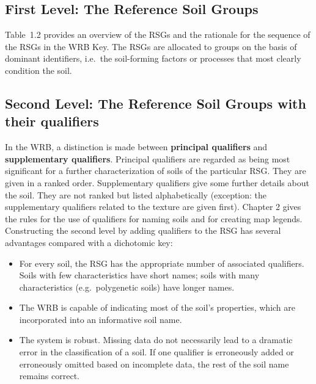 \documentclass[
  letterpaper,
  DIV=11,
  numbers=noendperiod]{scrreprt}
\providecommand{\tightlist}{%
  \setlength{\itemsep}{0pt}\setlength{\parskip}{0pt}}\usepackage{longtable,booktabs,array}
\begin{document}
\hypertarget{first-level-the-reference-soil-groups}{%
\subsection{First Level: The Reference Soil
Groups}\label{first-level-the-reference-soil-groups}}

Table~1.2 provides an overview of the RSGs and the rationale for the
sequence of the RSGs in the WRB Key. The RSGs are allocated to groups on
the basis of dominant identifiers, i.e.~the soil-forming factors or
processes that most clearly condition the soil.

\hypertarget{second-level-the-reference-soil-groups-with-their-qualifiers}{%
\subsection{Second Level: The Reference Soil Groups with their
qualifiers}\label{second-level-the-reference-soil-groups-with-their-qualifiers}}

In the WRB, a distinction is made between \textbf{principal qualifiers}
and \textbf{supplementary qualifiers}. Principal qualifiers are regarded
as being most significant for a further characterization of soils of the
particular RSG. They are given in a ranked order. Supplementary
qualifiers give some further details about the soil. They are not ranked
but listed alphabetically (exception: the supplementary qualifiers
related to the texture are given first). Chapter 2 gives the rules for
the use of qualifiers for naming soils and for creating map legends.
Constructing the second level by adding qualifiers to the RSG has
several advantages compared with a dichotomic key:

\begin{itemize}
\tightlist
\item
  For every soil, the RSG has the appropriate number of associated
  qualifiers. Soils with few characteristics have short names; soils
  with many characteristics (e.g.~polygenetic soils) have longer names.
\item
  The WRB is capable of indicating most of the soil's properties, which
  are incorporated into an informative soil name.
\item
  The system is robust. Missing data do not necessarily lead to a
  dramatic error in the classification of a soil. If one qualifier is
  erroneously added or erroneously omitted based on incomplete data, the
  rest of the soil name remains correct.
\end{itemize}
\end{document}
